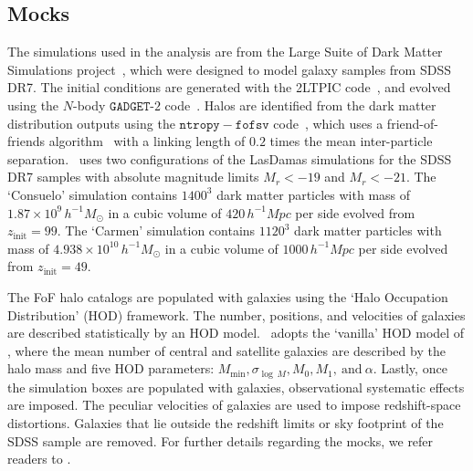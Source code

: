 \documentclass[12pt, letterpaper, preprint]{aastex6}
\newcommand{\Sinh}{\citetalias{sinha2017}\xspace}
\begin{document}
\subsection{\cite{sinha2017} Mocks} \label{sec:gmf} 
The simulations used in the \cite{sinha2017} analysis are from the
Large Suite of Dark Matter Simulations project~\citep[LasDamas;][]{mcbride2009}, 
which were designed to model galaxy samples from SDSS DR7. The 
initial conditions are generated with the {\fontshape\scdefault\selectfont 2LTPIC} code~\citep{scoccimarro1998, crocce2006}, 
and evolved using the $N$-body $\mathtt{GADGET}$-$2$ code~\citep{springel2005}.
Halos are identified from the dark matter distribution outputs using 
the $\mathtt{ntropy-fofsv}$ code~\citep{gardner2007}, which uses a 
friend-of-friends algorithm~\citep[FoF;][]{davis1985} with a linking length of $0.2$
times the mean inter-particle separation. %
\Sinh~uses two configurations of the LasDamas simulations for the 
SDSS DR7 samples with absolute magnitude limits $M_r < -19$ and $M_r < -21$.
The `Consuelo' simulation contains $1400^3$ dark matter particles with 
mass of $1.87 \times 10^9\,h^{-1} M_\odot$ in a cubic volume of 
$420\,h^{-1} Mpc$ per side evolved from $z_\mathrm{init} = 99$. 
The `Carmen' simulation contains $1120^3$ dark matter particles with mass 
of $4.938 \times 10^{10}\,h^{-1} M_\odot$ in a cubic volume of 
$1000\,h^{-1} Mpc$ per side evolved from $z_\mathrm{init} = 49$. 

The FoF halo catalogs are populated with galaxies using the 
`Halo Occupation Distribution' (HOD) framework. The 
number, positions, and velocities of galaxies are described statistically 
by an HOD model. \Sinh~adopts the `vanilla' HOD model of \cite{zheng2007}, 
where the mean number of central and satellite galaxies are described by 
the halo mass and five HOD parameters: $M_\mathrm{min}, 
\sigma_{\log\,M} , M_0, M_1,~\mathrm{and}~\alpha$. Lastly, once the 
simulation boxes are populated with galaxies, observational systematic 
effects are imposed. The peculiar velocities of galaxies are used to 
impose redshift-space distortions. Galaxies that lie outside the redshift
limits or sky footprint of the SDSS sample are removed. For further 
details regarding the mocks, we refer readers to \Sinh.
\end{document}
